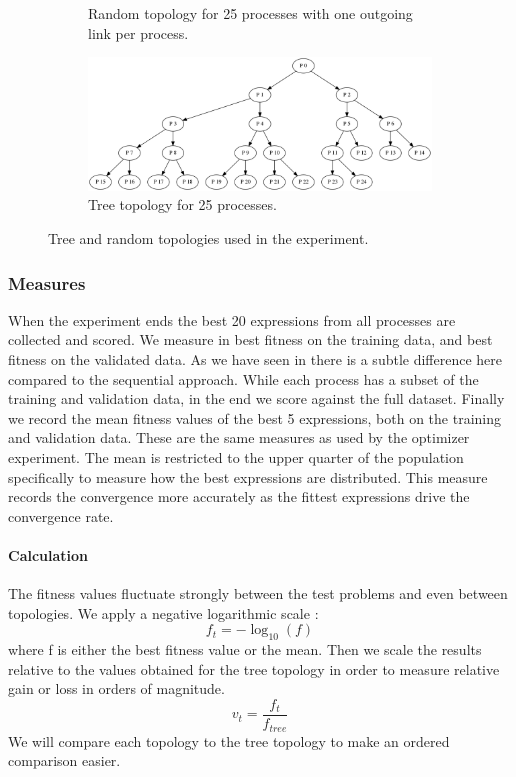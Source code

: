 \begin{figure}
\begin{subfigure}{0.6\textwidth}
        \caption{Random topology for 25 processes with one outgoing link per process.}
    \end{subfigure}%
    \begin{subfigure}{0.6\textwidth}
    \centering
        \includegraphics[width=0.8\linewidth]{figures/tree25.png}
        \caption{Tree topology for 25 processes.}
    \end{subfigure}
    \caption{Tree and random topologies used in the experiment.}
    \label{fig:experimenttopos}
    \end{figure}

\subsubsection{Measures}
When the experiment ends the best 20 expressions from all processes are collected and scored. We measure in best fitness on the training data, and best fitness on the validated data. As we have seen in %
there is a subtle difference here compared to the sequential approach. While each process has a subset of the training and validation data, in the end we score against the full dataset.
Finally we record the mean fitness values of the best 5 expressions, both on the training and validation data. These are the same measures as used by the optimizer experiment. The mean is restricted to the upper quarter of the population specifically to measure how the best expressions are distributed. This measure records the convergence more accurately as the fittest expressions drive the convergence rate. 
\paragraph{Calculation}
The fitness values fluctuate strongly between the test problems and even between topologies. We apply a negative logarithmic scale :
\[
f_t = -\log_{10}(f)
\]
where f is either the best fitness value or the mean. Then we scale the results relative to the values obtained for the tree topology in order to measure relative gain or loss in orders of magnitude.
\[
v_{t} = \frac{f_{t}}{f_{tree}}
\]
We will compare each topology to the tree topology to make an ordered comparison easier.
